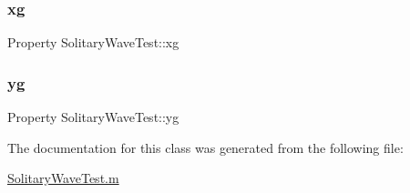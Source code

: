 \mbox{\label{class_solitary_wave_test_ab1478eed5cfba472ce2a85bd524930d3}} 
\subsubsection{\texorpdfstring{xg}{xg}}
{\footnotesize\ttfamily Property Solitary\+Wave\+Test\+::xg}

\mbox{\label{class_solitary_wave_test_aeb1997197dd20e04d564af1c4f184e1b}} 
\subsubsection{\texorpdfstring{yg}{yg}}
{\footnotesize\ttfamily Property Solitary\+Wave\+Test\+::yg}



The documentation for this class was generated from the following file\+:\begin{DoxyCompactItemize}
\item 
\hyperlink{_solitary_wave_test_8m}{Solitary\+Wave\+Test.\+m}\end{DoxyCompactItemize}
